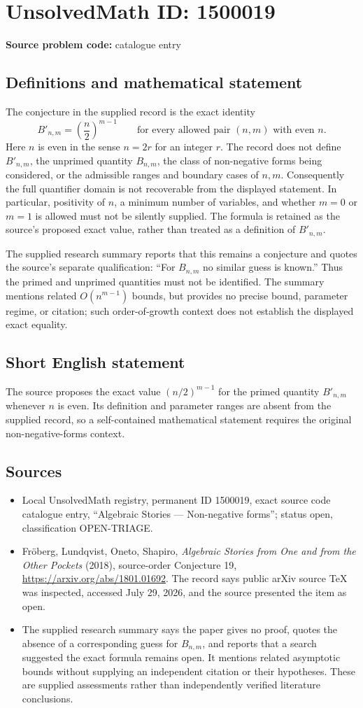\documentclass[11pt]{article}
\begin{document}
\section*{UnsolvedMath ID: 1500019}
\textbf{Source problem code:} catalogue entry
\subsection{Definitions and mathematical statement}
The conjecture in the supplied record is the exact identity
\[
B'_{n,m}=\left(\frac n2\right)^{m-1}
\qquad\text{for every allowed pair $(n,m)$ with even $n$}.
\]
Here $n$ is even in the sense $n=2r$ for an integer $r$. The record does not define $B'_{n,m}$, the unprimed quantity $B_{n,m}$, the class of non-negative forms being considered, or the admissible ranges and boundary cases of $n,m$. Consequently the full quantifier domain is not recoverable from the displayed statement. In particular, positivity of $n$, a minimum number of variables, and whether $m=0$ or $m=1$ is allowed must not be silently supplied. The formula is retained as the source's proposed exact value, rather than treated as a definition of $B'_{n,m}$.

The supplied research summary reports that this remains a conjecture and quotes the source's separate qualification: ``For $B_{n,m}$ no similar guess is known.'' Thus the primed and unprimed quantities must not be identified. The summary mentions related $O(n^{m-1})$ bounds, but provides no precise bound, parameter regime, or citation; such order-of-growth context does not establish the displayed exact equality.
\subsection{Short English statement}
The source proposes the exact value $(n/2)^{m-1}$ for the primed quantity $B'_{n,m}$ whenever $n$ is even. Its definition and parameter ranges are absent from the supplied record, so a self-contained mathematical statement requires the original non-negative-forms context.
\subsection{Sources}
\begin{itemize}
\item Local UnsolvedMath registry, permanent ID 1500019, exact source code catalogue entry, ``Algebraic Stories --- Non-negative forms''; status open, classification OPEN-TRIAGE.
\item Fr\"oberg, Lundqvist, Oneto, Shapiro, \emph{Algebraic Stories from One and from the Other Pockets} (2018), source-order Conjecture 19, \url{https://arxiv.org/abs/1801.01692}. The record says public arXiv source TeX was inspected, accessed July 29, 2026, and the source presented the item as open.
\item The supplied research summary says the paper gives no proof, quotes the absence of a corresponding guess for $B_{n,m}$, and reports that a search suggested the exact formula remains open. It mentions related asymptotic bounds without supplying an independent citation or their hypotheses. These are supplied assessments rather than independently verified literature conclusions.
\end{itemize}
\end{document}
